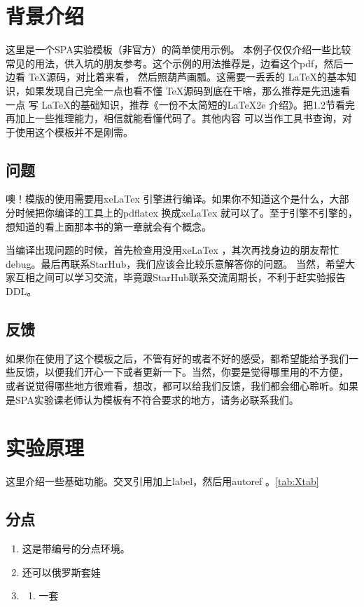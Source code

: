 \documentclass{spaexp}
\begin{document}
\maketitle %
\section{背景介绍}
    这里是一个SPA实验模板（非官方）的简单使用示例。
    本例子仅仅介绍一些比较常见的用法，供入坑的朋友参考。这个示例的用法推荐是，边看这个pdf，然后一边看 \TeX 源码，对比着来看，
    然后照葫芦画瓢。这需要一丢丢的 \LaTeX 的基本知识，如果发现自己完全一点也看不懂 \TeX 源码到底在干啥，那么推荐是先迅速看一点
    写 \LaTeX 的基础知识，推荐《一份不太简短的\LaTeX2e 介绍》。把1.2节看完再加上一些推理能力，相信就能看懂代码了。其他内容
    可以当作工具书查询，对于使用这个模板并不是刚需。
    \subsection{问题}
        噢！模版的使用需要用xeLaTex 引擎进行编译。如果你不知道这个是什么，大部分时候把你编译的工具上的pdflatex 换成xeLaTex 
        就可以了。至于引擎不引擎的，想知道的看上面那本书的第一章就会有个概念。\par
        
        当编译出现问题的时候，首先检查用没用xeLaTex ，其次再找身边的朋友帮忙debug。最后再联系StarHub，我们应该会比较乐意解答你的问题。
        当然，希望大家互相之间可以学习交流，毕竟跟StarHub联系交流周期长，不利于赶实验报告DDL。
    \subsection{反馈}
        如果你在使用了这个模板之后，不管有好的或者不好的感受，都希望能给予我们一些反馈，以便我们开心一下或者更新一下。当然，你要是觉得哪里用的不方便，
        或者说觉得哪些地方很难看，想改，都可以给我们反馈，我们都会细心聆听。如果是SPA实验课老师认为模板有不符合要求的地方，请务必联系我们。

\section{实验原理}
    这里介绍一些基础功能。交叉引用加上label，然后用autoref 。\autoref{tab:Xtab}

    \subsection{分点}
        \begin{enumerate}
            \item 这是带编号的分点环境。
            \item 还可以俄罗斯套娃
            \item \begin{enumerate}
                \item 一套
            \end{enumerate}
        \end{enumerate}
\end{document}
